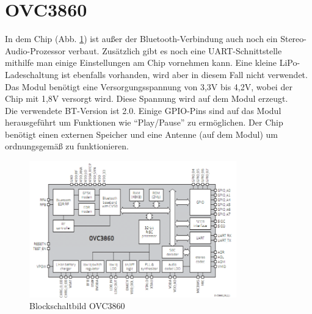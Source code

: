 \section{OVC3860}
In dem Chip (Abb. \ref {fig:abb2.1}) ist außer der Bluetooth-Verbindung auch noch ein Stereo-Audio-Prozessor verbaut. Zusätzlich gibt es noch eine UART-Schnittstelle mithilfe man einige Einstellungen am Chip vornehmen kann. Eine kleine LiPo-Ladeschaltung ist ebenfalls vorhanden, wird aber in diesem Fall nicht verwendet.\\
Das Modul benötigt eine Versorgungsspannung von 3,3V bis 4,2V, wobei der Chip mit 1,8V versorgt wird. Diese Spannung wird auf dem Modul erzeugt.\\
Die verwendete BT-Version ist 2.0. Einige GPIO-Pins sind auf das Modul herausgeführt um Funktionen wie \enquote{Play/Pause} zu ermöglichen. Der Chip benötigt einen externen Speicher und eine Antenne (auf dem Modul) um ordnungsgemäß zu funktionieren.
\begin{figure} [h]
	\centering
	\includegraphics[width=0.8\textwidth]{img/blockschaltbild.png}
	\caption{Blockschaltbild OVC3860}\label {fig:abb2.1}
\end{figure}


